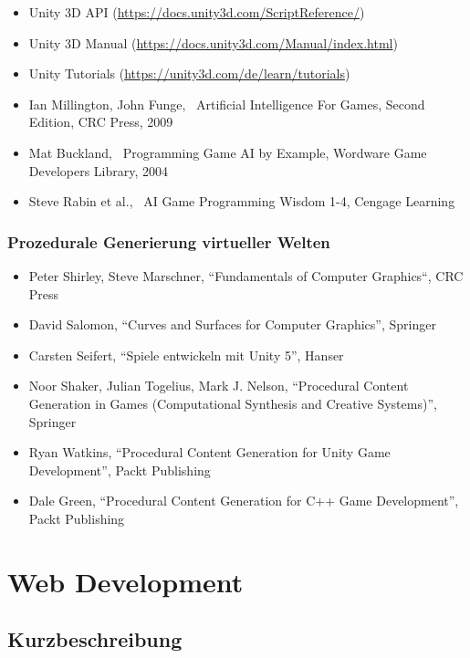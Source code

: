 \begin{itemize}
\item
  Unity 3D API (\url{https://docs.unity3d.com/ScriptReference/})
\item
  Unity 3D Manual (\url{https://docs.unity3d.com/Manual/index.html})
\item
  Unity Tutorials (\url{https://unity3d.com/de/learn/tutorials})
\item
  Ian Millington, John Funge,~ Artificial Intelligence For Games, Second
  Edition, CRC Press, 2009
\item
  Mat Buckland,~ Programming Game AI by Example, Wordware Game
  Developers Library, 2004
\item
  Steve Rabin et al.,~ AI Game Programming Wisdom 1-4, Cengage Learning
\end{itemize}

\subsection*{Prozedurale Generierung virtueller
Welten}\label{prozedurale-generierung-virtueller-welten-3}

\begin{itemize}
\item
  Peter Shirley, Steve Marschner, ``Fundamentals of Computer Graphics``,
  CRC Press
\item
  David Salomon, ``Curves and Surfaces for Computer Graphics'', Springer
\item
  Carsten Seifert, ``Spiele entwickeln mit Unity 5'', Hanser
\item
  Noor Shaker, Julian Togelius, Mark J. Nelson, ``Procedural Content
  Generation in Games (Computational Synthesis and Creative Systems)'',
  Springer
\item
  Ryan Watkins, ``Procedural Content Generation for Unity Game
  Development'', Packt Publishing
\item
  Dale Green, ``Procedural Content Generation for C++ Game
  Development'', Packt Publishing
\end{itemize}

\chapter{Web Development}\label{web-development}

\section*{Kurzbeschreibung}\label{kurzbeschreibung-5}


